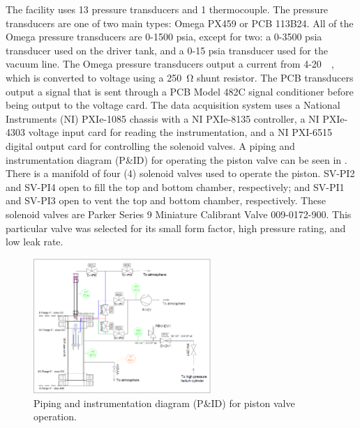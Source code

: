 The facility uses 13 pressure transducers and 1 thermocouple. The pressure transducers are one of two main types: Omega PX459 or PCB 113B24. All of the Omega pressure transducers are 0-1500 psia, except for two: a 0-3500 psia transducer used on the driver tank, and a 0-15 psia transducer used for the vacuum line. The Omega pressure transducers output a current from 4-\SI{20}{\milli\amp}, which is converted to voltage using a \SI{250}{\ohm} shunt resistor. The PCB transducers output a signal that is sent through a PCB Model 482C signal conditioner before being output to the voltage card. The data acquisition system uses a National Instruments (NI) PXIe-1085 chassis with a NI PXIe-8135 controller, a NI PXIe-4303 voltage input card for reading the instrumentation, and a NI PXI-6515 digital output card for controlling the solenoid valves. A piping and instrumentation diagram (P\&ID) for operating the piston valve can be seen in . There is a manifold of four (4) solenoid valves used to operate the piston. SV-PI2 and SV-PI4 open to fill the top and bottom chamber, respectively; and SV-PI1 and SV-PI3 open to vent the top and bottom chamber, respectively. These solenoid valves are Parker Series 9 Miniature Calibrant Valve 009-0172-900. This particular valve was selected for its small form factor, high pressure rating, and low leak rate.



%
\begin{figure}[htbp]
    \vspace{16pt}
    \centering
    \includegraphics[width=0.6\textwidth]{experiment/photos/HENRI_valve_PID.PNG}
    \caption{Piping and instrumentation diagram (P\&ID) for piston valve operation.}
    \label{fig:sv pid}
    \vspace{16pt}
\end{figure}
%




